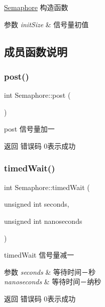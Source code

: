 \hyperlink{classSemaphore}{Semaphore} 构造函数 


\begin{DoxyParams}{参数}
{\em init\+Size} & 信号量初值 \\
\hline
\end{DoxyParams}


\subsection{成员函数说明}
\mbox{\label{classSemaphore_a93794b9ab0c6c7c35acce0769bf67caf}} 
\subsubsection{\texorpdfstring{post()}{post()}}
{\footnotesize\ttfamily int Semaphore\+::post (\begin{DoxyParamCaption}{ }\end{DoxyParamCaption})\hspace{0.3cm}{\ttfamily [inline]}}



post 信号量加一 

\begin{DoxyReturn}{返回}
错误码 0表示成功 
\end{DoxyReturn}
\mbox{\label{classSemaphore_a203e6b9f726ca5defc94379e9145278e}} 
\subsubsection{\texorpdfstring{timed\+Wait()}{timedWait()}}
{\footnotesize\ttfamily int Semaphore\+::timed\+Wait (\begin{DoxyParamCaption}\item[{unsigned int}]{seconds,  }\item[{unsigned int}]{nanoseconds }\end{DoxyParamCaption})\hspace{0.3cm}{\ttfamily [inline]}}



timed\+Wait 信号量减一 


\begin{DoxyParams}{参数}
{\em seconds} & 等待时间－秒 \\
\hline
{\em nanoseconds} & 等待时间－纳秒\\
\hline
\end{DoxyParams}
\begin{DoxyReturn}{返回}
错误码 0表示成功 
\end{DoxyReturn}
\mbox{\label{classSemaphore_acc15178e43d33745f4acc6e2b2cccf9b}} 
